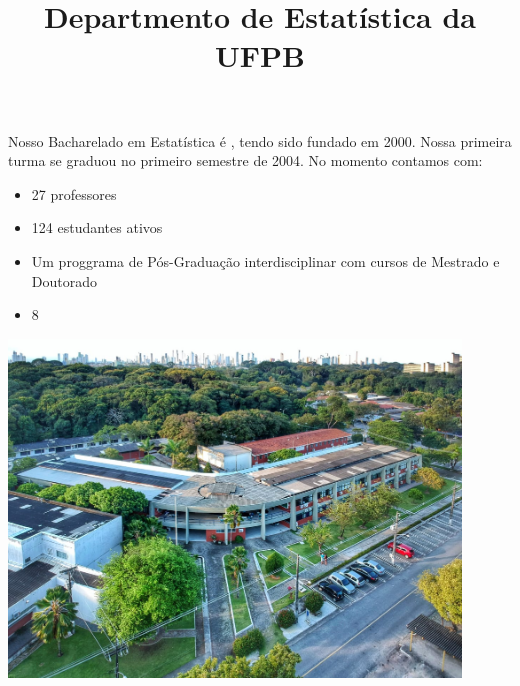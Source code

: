 \begin{titlepage}
\title{
\Huge\color{escurode}
	\textbf{Departmento de Estatística da UFPB}
}
\date{}
\end{titlepage}


\maketitle

Nosso Bacharelado em Estatística é , tendo sido fundado em 2000. Nossa primeira turma se graduou no primeiro semestre de 2004. No momento contamos com:


\begin{itemize}
    \item 27 professores
    \item 124 estudantes ativos
    \item Um proggrama de Pós-Graduação interdisciplinar com cursos de Mestrado e Doutorado
    \item 8  %
    
\end{itemize}

\begin{center}
\includegraphics[width=0.9\textwidth]{figuras/bumerangue.jpg}
\end{center}